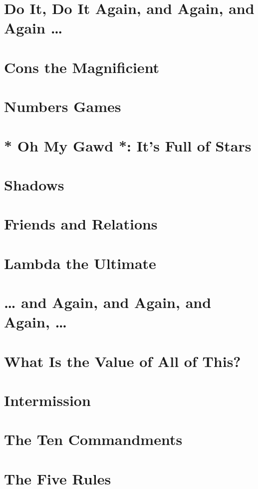 \documentclass[11pt]{article}
\begin{document}
\section{Do It, Do It Again, and Again, and Again \ldots{}}
\label{sec:org5cb434f}

\section{Cons the Magnificient}
\label{sec:org4005f26}

\section{Numbers Games}
\label{sec:org6d858f9}

\section{* Oh My Gawd *: It's Full of Stars}
\label{sec:org93923b1}

\section{Shadows}
\label{sec:org86e8f1b}

\section{Friends and Relations}
\label{sec:org9d6c68d}

\section{Lambda the Ultimate}
\label{sec:orgfd02769}

\section{\ldots{} and Again, and Again, and Again, \ldots{}}
\label{sec:org5116866}

\section{What Is the Value of All of This?}
\label{sec:org9268297}

\section{Intermission}
\label{sec:org7cc5137}

\section{The Ten Commandments}
\label{sec:org560fffe}

\section{The Five Rules}
\label{sec:orgcb4ac5f}
\end{document}

